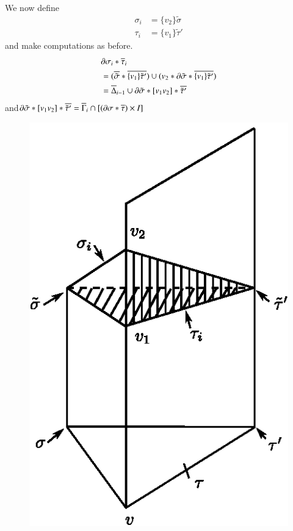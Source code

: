 We now define
\begin{align*}
\sigma_{i} &=\{v_{2}\}\tilde{\sigma}\\
\tau_{i} &= \{v_{1}\}\tilde{\tau}'
\end{align*}
and make computations as before.
\begin{align*}
& \partial \sigma_{i}\ast\overline{\tau}_{i}\\
&= (\overline{\tilde{\sigma}}\ast\overline{\{v_{1}\}\tilde{\tau}'})\cup (v_{2}\ast\partial \tilde{\sigma}\ast\overline{\{v_{1}\}\tilde{\tau}'})\\
&= \overline{\Delta}_{i-1}\cup \partial \tilde{\sigma}\ast[v_{1}v_{2}]\ast \overline{\tilde{\tau}'}
\end{align*}
and\pageoriginale $\partial \tilde{\sigma}\ast [v_{1}v_{2}]\ast \overline{\tilde{\tau}'}=\overline{\Gamma}_{i}\cap [(\partial \sigma\ast \overline{\tau})\times I]$
\begin{figure}[H]
\centering
\includegraphics{figure/fig20.eps}
\end{figure}

